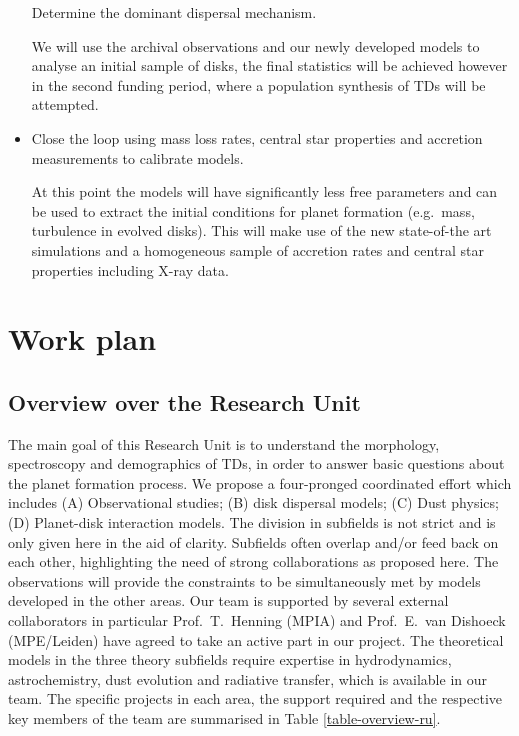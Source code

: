 \documentclass[10pt,fleqn,twoside,a4paper]{article}
\begin{document}
\begin{itemize}
\begin{Emphasize}
  Determine the dominant dispersal mechanism.
\end{Emphasize}
We will
use the archival observations and our newly developed models to analyse
an initial sample of disks, the final statistics will be achieved
however in the second funding period, where a population synthesis of
TDs will be attempted.
\item 
\begin{Emphasize}
  Close the loop using mass loss rates, central star properties and
  accretion measurements to calibrate models.
\end{Emphasize}
At this
point the models will have significantly less free parameters and can
be used to extract the initial conditions for planet formation
(e.g.\ mass, turbulence in evolved disks). This will make use of the new state-of-the
art simulations and a homogeneous sample of accretion rates and central
star properties including X-ray data. 
\end{itemize}

\section{Work plan}

\subsection{Overview over the Research Unit}
%
The main goal of this Research Unit is to understand the morphology,
spectroscopy and demographics of TDs, in order to answer
basic questions about the planet formation process. We propose a
four-pronged coordinated effort which includes (A) Observational
studies; (B) disk dispersal models; (C) Dust physics; (D) Planet-disk
interaction models. The division in subfields is not strict and is
only given here in the aid of clarity. Subfields often overlap and/or
feed back on each other, highlighting the need of strong
collaborations as proposed here. The observations will provide the
constraints to be simultaneously met by models developed in the other
areas. Our team is supported by several external collaborators in particular
Prof.\ T.\ Henning (MPIA) and Prof.\ E.\ van Dishoeck (MPE/Leiden) have
agreed to take an active part in our project. The theoretical models in the three theory subfields require
expertise in hydrodynamics, astrochemistry, dust evolution and
radiative transfer, which is available in our team. The specific
projects in each area, the support required and the respective key members
of the team are summarised in Table \ref{table-overview-ru}.
\end{document}
